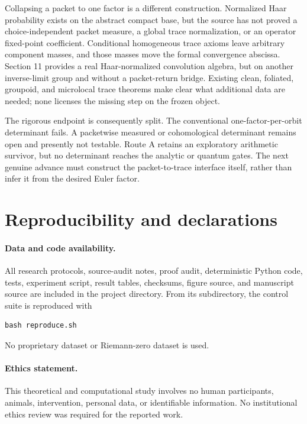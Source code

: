 \documentclass[11pt]{article}
\theoremstyle{definition}
\theoremstyle{remark}
\begin{document}
Collapsing a packet to one factor is a different construction.  Normalized
Haar probability exists on the abstract compact base, but the source has not
proved a choice-independent packet measure, a global trace normalization, or
an operator fixed-point coefficient.  Conditional homogeneous trace axioms
leave arbitrary component masses, and those masses move the formal
convergence abscissa.  Section 11 provides a real Haar-normalized convolution
algebra, but on another inverse-limit group and without a packet-return
bridge.  Existing clean, foliated, groupoid, and microlocal trace theorems make
clear what additional data are needed; none licenses the missing step on the
frozen object.

The rigorous endpoint is consequently split.  The conventional
one-factor-per-orbit determinant fails.  A packetwise measured or
cohomological determinant remains open and presently not testable.  Route A
retains an exploratory arithmetic survivor, but no determinant reaches the
analytic or quantum gates.  The next genuine advance must construct the
packet-to-trace interface itself, rather than infer it from the desired Euler
factor.

\section*{Reproducibility and declarations}

\paragraph{Data and code availability.}
All research protocols, source-audit notes, proof audit, deterministic Python
code, tests, experiment script, result tables, checksums, figure source, and
manuscript source are included in the
 project directory.  From its
 subdirectory, the control suite is reproduced with
\begin{verbatim}
bash reproduce.sh
\end{verbatim}
No proprietary dataset or Riemann-zero dataset is used.

\paragraph{Ethics statement.}
This theoretical and computational study involves no human participants,
animals, intervention, personal data, or identifiable information.  No
institutional ethics review was required for the reported work.
\end{document}
